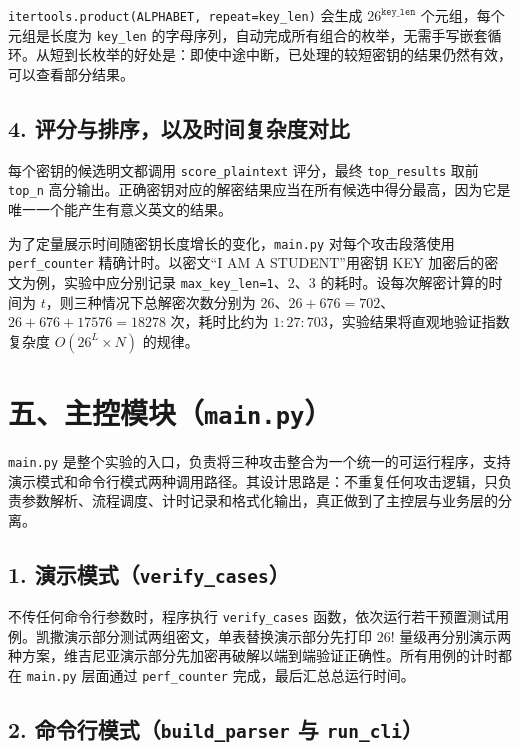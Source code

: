 \documentclass[12pt, a4paper]{article}
\begin{document}
\texttt{itertools.product(ALPHABET, repeat=key\_len)} 会生成 $26^{\texttt{key\_len}}$ 个元组，每个元组是长度为 \texttt{key\_len} 的字母序列，自动完成所有组合的枚举，无需手写嵌套循环。从短到长枚举的好处是：即使中途中断，已处理的较短密钥的结果仍然有效，可以查看部分结果。

\subsection{4. 评分与排序，以及时间复杂度对比}

每个密钥的候选明文都调用 \texttt{score\_plaintext} 评分，最终 \texttt{top\_results} 取前 \texttt{top\_n} 高分输出。正确密钥对应的解密结果应当在所有候选中得分最高，因为它是唯一一个能产生有意义英文的结果。

为了定量展示时间随密钥长度增长的变化，\texttt{main.py} 对每个攻击段落使用 \texttt{perf\_counter} 精确计时。以密文``I AM A STUDENT''用密钥 KEY 加密后的密文为例，实验中应分别记录 \texttt{max\_key\_len=1}、2、3 的耗时。设每次解密计算的时间为 $t$，则三种情况下总解密次数分别为 26、$26+676=702$、$26+676+17576=18278$ 次，耗时比约为 $1:27:703$，实验结果将直观地验证指数复杂度 $O(26^L \times N)$ 的规律。

\section{五、主控模块（\texttt{main.py}）}

\texttt{main.py} 是整个实验的入口，负责将三种攻击整合为一个统一的可运行程序，支持演示模式和命令行模式两种调用路径。其设计思路是：不重复任何攻击逻辑，只负责参数解析、流程调度、计时记录和格式化输出，真正做到了主控层与业务层的分离。

\subsection{1. 演示模式（\texttt{verify\_cases}）}

不传任何命令行参数时，程序执行 \texttt{verify\_cases} 函数，依次运行若干预置测试用例。凯撒演示部分测试两组密文，单表替换演示部分先打印 $26!$ 量级再分别演示两种方案，维吉尼亚演示部分先加密再破解以端到端验证正确性。所有用例的计时都在 \texttt{main.py} 层面通过 \texttt{perf\_counter} 完成，最后汇总总运行时间。

\subsection{2. 命令行模式（\texttt{build\_parser} 与 \texttt{run\_cli}）}
\end{document}
